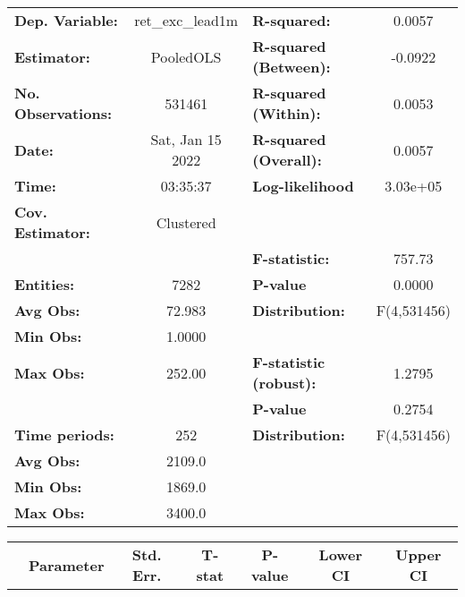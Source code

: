 \begin{center}
\begin{tabular}{lclc}
\toprule
\textbf{Dep. Variable:}    &  ret\_exc\_lead1m  & \textbf{  R-squared:         }   &      0.0057      \\
\textbf{Estimator:}        &     PooledOLS      & \textbf{  R-squared (Between):}  &     -0.0922      \\
\textbf{No. Observations:} &       531461       & \textbf{  R-squared (Within):}   &      0.0053      \\
\textbf{Date:}             &  Sat, Jan 15 2022  & \textbf{  R-squared (Overall):}  &      0.0057      \\
\textbf{Time:}             &      03:35:37      & \textbf{  Log-likelihood     }   &     3.03e+05     \\
\textbf{Cov. Estimator:}   &     Clustered      & \textbf{                     }   &                  \\
\textbf{}                  &                    & \textbf{  F-statistic:       }   &      757.73      \\
\textbf{Entities:}         &        7282        & \textbf{  P-value            }   &      0.0000      \\
\textbf{Avg Obs:}          &       72.983       & \textbf{  Distribution:      }   &   F(4,531456)    \\
\textbf{Min Obs:}          &       1.0000       & \textbf{                     }   &                  \\
\textbf{Max Obs:}          &       252.00       & \textbf{  F-statistic (robust):} &      1.2795      \\
\textbf{}                  &                    & \textbf{  P-value            }   &      0.2754      \\
\textbf{Time periods:}     &        252         & \textbf{  Distribution:      }   &   F(4,531456)    \\
\textbf{Avg Obs:}          &       2109.0       & \textbf{                     }   &                  \\
\textbf{Min Obs:}          &       1869.0       & \textbf{                     }   &                  \\
\textbf{Max Obs:}          &       3400.0       & \textbf{                     }   &                  \\
\bottomrule
\end{tabular}
\begin{tabular}{lcccccc}
                & \textbf{Parameter} & \textbf{Std. Err.} & \textbf{T-stat} & \textbf{P-value} & \textbf{Lower CI} & \textbf{Upper CI}  \\

\end{tabular}
\end{center}
